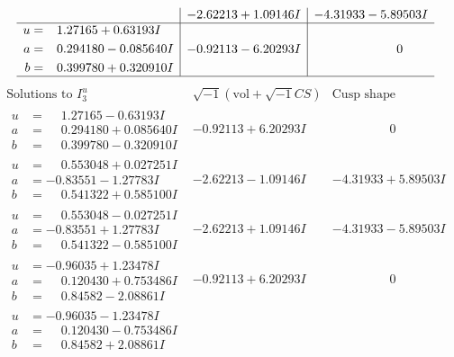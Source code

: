 \documentclass[1p]{elsarticle_modified}
\theoremstyle{definition}
\newcommand{\I}{\sqrt{-1}}
\begin{document}
$$\begin{array}{c|c|c}
 & -2.62213 + 1.09146 I & -4.31933 - 5.89503 I \\ \hline\begin{aligned}
u &= \phantom{-}1.27165 + 0.63193 I \\
a &= \phantom{-}0.294180 - 0.085640 I \\
b &= \phantom{-}0.399780 + 0.320910 I\end{aligned}
 & -0.92113 - 6.20293 I & \phantom{-0.000000 } 0\\
 \hline 
 \end{array}$$\newpage$$\begin{array}{c|c|c}  
\text{Solutions to }I^u_{3}& \I (\text{vol} + \sqrt{-1}CS) & \text{Cusp shape}\\
 \hline 
\begin{aligned}
u &= \phantom{-}1.27165 - 0.63193 I \\
a &= \phantom{-}0.294180 + 0.085640 I \\
b &= \phantom{-}0.399780 - 0.320910 I\end{aligned}
 & -0.92113 + 6.20293 I & \phantom{-0.000000 } 0 \\ \hline\begin{aligned}
u &= \phantom{-}0.553048 + 0.027251 I \\
a &= -0.83551 - 1.27783 I \\
b &= \phantom{-}0.541322 + 0.585100 I\end{aligned}
 & -2.62213 - 1.09146 I & -4.31933 + 5.89503 I \\ \hline\begin{aligned}
u &= \phantom{-}0.553048 - 0.027251 I \\
a &= -0.83551 + 1.27783 I \\
b &= \phantom{-}0.541322 - 0.585100 I\end{aligned}
 & -2.62213 + 1.09146 I & -4.31933 - 5.89503 I \\ \hline\begin{aligned}
u &= -0.96035 + 1.23478 I \\
a &= \phantom{-}0.120430 + 0.753486 I \\
b &= \phantom{-}0.84582 - 2.08861 I\end{aligned}
 & -0.92113 + 6.20293 I & \phantom{-0.000000 } 0 \\ \hline\begin{aligned}
u &= -0.96035 - 1.23478 I \\
a &= \phantom{-}0.120430 - 0.753486 I \\
b &= \phantom{-}0.84582 + 2.08861 I\end{aligned}

\end{array}$$
\end{document}
